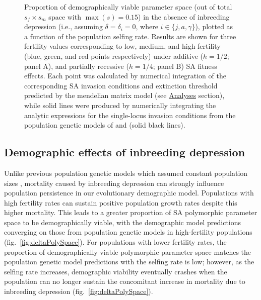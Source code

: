 \documentclass[11pt]{article}
\begin{document}
 \begin{figure}[htbp]
 \centering
 \caption{\footnotesize{Proportion of demographically viable parameter space (out of total $s_f \times s_m$ space with $\max(s) = 0.15$) in the absence of inbreeding depression (i.e., assuming $\delta = \delta_i = 0$, where $i \in \{j,a,\gamma\}$), plotted as a function of the population selfing rate. Results are shown for three fertility values corresponding to low, medium, and high fertility (blue, green, and red points respectively) under additive ($h = 1/2$; panel A), and partially recessive ($h = 1/4$; panel B) SA fitness effects. Each point was calculated by numerical integration of the corresponding SA invasion conditions and extinction threshold predicted by the mendelian matrix model (see \hyperref[subsec:analyses]{Analyses} section), while solid lines were produced by numerically integrating the analytic expressions for the single-locus invasion conditions from the population genetic models of \citet{JordanConnallon2014} and \citet{Olito2017} (solid black lines).}} 
 \label{fig:polySpace}
 \end{figure}



\subsection{Demographic effects of inbreeding depression} \label{subsec:InbreedEffects}

Unlike previous population genetic models which assumed constant population sizes \citep{JordanConnallon2014,Olito2017}, mortality caused by inbreeding depression can strongly influence population persistence in our evolutionary demographic model. Populations with high fertility rates can sustain positive population growth rates despite this higher mortality. This leads to a greater proportion of SA polymorphic parameter space to be demographically viable, with the demographic model predictions converging on those from population genetic models in high-fertility populations (fig.~\ref{fig:deltaPolySpace}). For populations with lower fertility rates, the proportion of demographically viable polymorphic parameter space matches the population genetic model predictions with the selfing rate is low; however, as the selfing rate increases, demographic viability eventually crashes when the population can no longer sustain the concomitant increase in mortality due to inbreeding depression (fig.~\ref{fig:deltaPolySpace}). 
\end{document}
